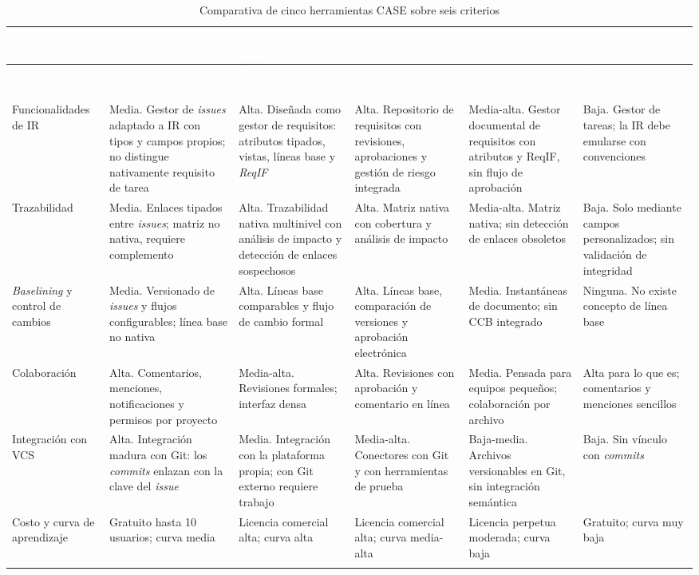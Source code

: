 \documentclass[11pt,letterpaper]{article}
\newcommand{\thead}[1]{\cellcolor{uteqverde}\textcolor{white}{\textbf{#1}}}
\begin{document}
\small
\begin{longtable}{|p{2.1cm}|p{2.5cm}|p{2.5cm}|p{2.4cm}|p{2.2cm}|p{2.0cm}|}
\hline
\thead{Criterio} & \thead{Jira} & \thead{IBM DOORS Next} & \thead{Jama Connect} & \thead{ReqView} & \thead{Trello} \\ \hline
\endfirsthead
\hline
\thead{Criterio} & \thead{Jira} & \thead{IBM DOORS Next} & \thead{Jama Connect} & \thead{ReqView} & \thead{Trello} \\ \hline
\endhead
Funcionalidades de IR & Media. Gestor de \emph{issues} adaptado a IR con tipos y campos propios; no distingue nativamente requisito de tarea & Alta. Diseñada como gestor de requisitos: atributos tipados, vistas, líneas base y \emph{ReqIF} & Alta. Repositorio de requisitos con revisiones, aprobaciones y gestión de riesgo integrada & Media-alta. Gestor documental de requisitos con atributos y ReqIF, sin flujo de aprobación & Baja. Gestor de tareas; la IR debe emularse con convenciones \\ \hline
Trazabilidad & Media. Enlaces tipados entre \emph{issues}; matriz no nativa, requiere complemento & Alta. Trazabilidad nativa multinivel con análisis de impacto y detección de enlaces sospechosos & Alta. Matriz nativa con cobertura y análisis de impacto & Media-alta. Matriz nativa; sin detección de enlaces obsoletos & Baja. Solo mediante campos personalizados; sin validación de integridad \\ \hline
\emph{Baselining} y control de cambios & Media. Versionado de \emph{issues} y flujos configurables; línea base no nativa & Alta. Líneas base comparables y flujo de cambio formal & Alta. Líneas base, comparación de versiones y aprobación electrónica & Media. Instantáneas de documento; sin CCB integrado & Ninguna. No existe concepto de línea base \\ \hline
Colaboración & Alta. Comentarios, menciones, notificaciones y permisos por proyecto & Media-alta. Revisiones formales; interfaz densa & Alta. Revisiones con aprobación y comentario en línea & Media. Pensada para equipos pequeños; colaboración por archivo & Alta para lo que es; comentarios y menciones sencillos \\ \hline
Integración con VCS & Alta. Integración madura con Git: los \emph{commits} enlazan con la clave del \emph{issue} & Media. Integración con la plataforma propia; con Git externo requiere trabajo & Media-alta. Conectores con Git y con herramientas de prueba & Baja-media. Archivos versionables en Git, sin integración semántica & Baja. Sin vínculo con \emph{commits} \\ \hline
Costo y curva de aprendizaje & Gratuito hasta 10 usuarios; curva media & Licencia comercial alta; curva alta & Licencia comercial alta; curva media-alta & Licencia perpetua moderada; curva baja & Gratuito; curva muy baja \\ \hline
\caption{Comparativa de cinco herramientas CASE sobre seis criterios}
\end{longtable}
\normalsize
\end{document}
